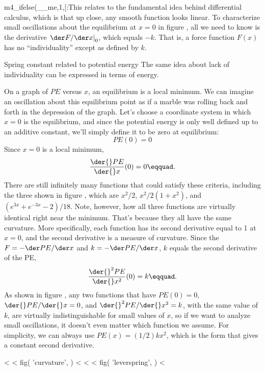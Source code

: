 m4_ifelse(__me,1,[:This relates to the fundamental idea behind differential calculus, which is
that up close, any smooth function looks linear. To characterize small oscillations about
the equilibrium at $x=0$ in figure , all we need to know is 
the derivative $\left.\der F/\der x\right|_{0}$, which equals $-k$.
That is, a force function $F(x)$ has no ``individuality'' except as defined by $k$.

\begin{eg}{Spring constant related to potential energy}
        The same idea about lack of individuality can be expressed in terms of energy.

        On a graph of $PE$ versus $x$, an equilibrium is a local minimum. We can imagine
        an oscillation about this equilibrium point as if a marble was rolling back and forth in the depression of the graph.
        Let's choose a coordinate system in which $x=0$ is the equilibrium, and since the potential energy
        is only well defined up to an additive constant, we'll simply
        define it to be zero at equilibrium:
        \begin{equation*}
                PE(0) = 0
        \end{equation*}
        Since $x=0$ is a local minimum,
        \begin{equation*}
                \frac{\der{}PE}{\der{}x}(0) = 0\eqquad.
        \end{equation*}
        There are still infinitely many functions that could satisfy these criteria,
        including the three shown in figure , which are
        $x^2/2$, $x^2/2(1+x^2)$, and $(e^{3x}+e^{-3x}-2)/18$. Note,
        however, how all three functions are virtually identical right near the
        minimum. That's because they all have the same curvature. More specifically,
        each function has its second derivative equal to 1 at $x=0$, and the second
        derivative is a measure of curvature. Since the $F=-\der PE/\der x$ and $k=-\der PE/\der x$, $k$ equals the second derivative
        of the PE,
        \begin{equation*}
                \frac{\der{}^2 PE}{\der{}x^2}(0) = k\eqquad.
        \end{equation*}
        As shown in figure
        , any two functions that have $PE(0)=0$, $\der{}PE/\der{}x=0$, and
        $\der{}^2 PE/\der{}x^2=k$, with the same value of $k$, are virtually indistinguishable
        for small values of $x$, so if we want to analyze small oscillations, it doesn't even
        matter which function we assume. For simplicity, we can always use $PE(x)=(1/2)kx^2$,
        which is the form that gives a constant second derivative.
\end{eg}
<%
<%
  fig(
    'curvature',
  )
<%
<%
<%
  fig(
    'leverspring',
  )
<%

